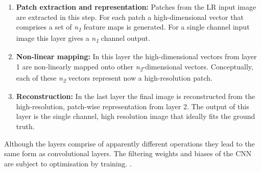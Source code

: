 \documentclass[
			fontsize = 12pt,
			paper = a4
			]
			{scrartcl}%
\newcommand{\?}{\ensuremath{^\texttt{\textbf [CITATION~NEEDED]}}}
\begin{document}
\begin{enumerate}
    \item \textbf{Patch extraction and representation:} \newline Patches from the LR input image are extracted in this step. For each patch a high-dimensional vector that comprises a set of \textit{n\textsubscript{1}} feature maps is generated. For a single channel input image this layer gives a \textit{n\textsubscript{1}} channel output.
    
    \item \textbf{Non-linear mapping:} \newline In this layer the high-dimensional vectors from layer 1 are non-linearly mapped onto other \textit{n\textsubscript{2}}-dimensional vectors. Conceptually, each of these \textit{n\textsubscript{2}} vectors represent now a high-resolution patch. 
    
    \item \textbf{Reconstruction:} \newline In the last layer the final image is reconstructed from the high-resolution, patch-wise representation from layer 2. The output of this layer is the single channel, high resolution image that ideally fits the ground truth.
\end{enumerate}
 
 Although the layers comprise of apparently different operations they lead to the same form as convolutional layers. The filtering weights and biases of the CNN are subject to optimisation by training. \cite{dong2015image}. 
\end{document}
